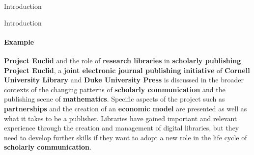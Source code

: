 \begin{frame}{Introduction}
\begin{center}
    \end{center}
  \end{frame}

  \begin{frame}{Introduction}
    \framesubtitle{Example}

    \begin{exampleblock}{\small \textbf{Project Euclid} and the role of
                         \textbf{research libraries} in \textbf{scholarly
                         publishing}}
      \justifying
      \small \textbf{Project Euclid}, a \textbf{joint electronic journal
      publishing initiative} of \textbf{Cornell University Library} and
      \textbf{Duke University Press} is discussed in the broader contexts of the
      changing patterns of \textbf{scholarly communication} and the publishing
      scene of \textbf{mathematics}. Specific aspects of the project such as
      \textbf{partnerships} and the creation of an \textbf{economic model} are
      presented as well as what it takes to be a publisher. Libraries have
      gained important and relevant experience through the creation and
      management of digital libraries, but they need to develop further skills
      if they want to adopt a new role in the life cycle of \textbf{scholarly
      communication}.
    \end{exampleblock}
  \end{frame}


